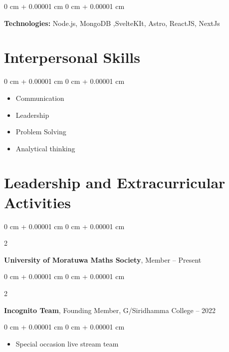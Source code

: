 \documentclass[10pt, letterpaper]{article}
\newenvironment{highlights}{
    \begin{itemize}[
        topsep=0.10 cm,
        parsep=0.10 cm,
        partopsep=0pt,
        itemsep=0pt,
        leftmargin=0 cm + 10pt
    ]
}{
    \end{itemize}
} %
\newenvironment{onecolentry}{
    \begin{adjustwidth}{
        0 cm + 0.00001 cm
    }{
        0 cm + 0.00001 cm
    }
}{
    \end{adjustwidth}
} %
\newenvironment{twocolentry}[2][]{
    \onecolentry
    \def\secondColumn{#2}
    \setcolumnwidth{\fill, 4.5 cm}
    \begin{paracol}{2}
}{
    \switchcolumn \raggedleft \secondColumn
    \end{paracol}
    \endonecolentry
} %
\begin{document}
        \vspace{0.2 cm}

        \begin{onecolentry}
            \textbf{Technologies:} Node.js, MongoDB ,SvelteKIt, Astro, ReactJS, NextJs
        \end{onecolentry}
    
    \section{Interpersonal Skills}



        
        \begin{onecolentry}
            \begin{highlights}
                \item Communication
                \item Leadership
                \item Problem Solving
                \item Analytical thinking
            \end{highlights}
        \end{onecolentry}
    
    \section{Leadership and Extracurricular Activities}

        \begin{twocolentry}{
            2024 – Present
        }
            \textbf{University of Moratuwa Maths Society}, Member\end{twocolentry}

        \vspace{0.30 cm}
        \begin{twocolentry}{
            2018 – 2022
        }
            \textbf{Incognito Team}, Founding Member, G/Siridhamma College\end{twocolentry}

        \vspace{0.10 cm}
        \begin{onecolentry}
            \begin{highlights}
                \item Special occasion live stream team
            \end{highlights}
        \end{onecolentry}
\end{document}

